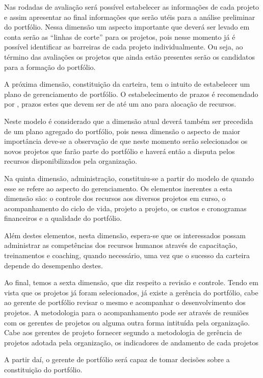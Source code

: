 \documentclass[12pt,a4paper,ruledheader,tocpage=prefix,floatnumber=continuous,pagestart=folhaderosto,font=times]{abnt}
\begin{document}
Nas rodadas de avaliação será possível estabelecer as informações de cada projeto e assim apresentar ao final informações que serão utéis para a análise 
preliminar do portfólio. Nessa dimensão um aspecto importante que deverá ser levado em conta serão as ``linhas de corte'' para os projetos, pois nesse 
momento já é possível identificar as barreiras de cada projeto individualmente. Ou seja, ao término das avaliações os projetos que ainda estão presentes 
serão os candidatos para a formação do portfólio.

A próxima dimensão, constituição da carteira, tem o intuito de estabelecer um plano de gerenciamento de portfólio. O estabelecimento de prazos é 
recomendado por \cite{clark}, prazos estes que devem ser de até um ano para alocação de recursos. 

Neste modelo é considerado que a dimensão atual deverá também ser precedida de um plano agregado do portfólio, pois nessa dimensão o aspecto de maior 
importância deve-se a observação de que neste momento serão selecionados os novos projetos que farão parte do portfólio e haverá então a disputa pelos 
recursos disponibilizados pela organização.

Na quinta dimensão, administração, constituiu-se a partir do modelo de \cite{crawford} quando esse se refere ao aspecto do gerenciamento. Os elementos 
inerentes a esta dimensão são: o controle dos recursos aos diversos projetos em curso, o acompanhamento do ciclo de vida, projeto a projeto, os custos e 
cronogramas financeiros e a qualidade do portfólio. 

Além destes elementos, nesta dimensão, espera-se que os interessados possam administrar as competências dos recursos humanos através de capacitação, 
treinamentos e coaching, quando necessário, uma vez que o sucesso da carteira depende do desempenho destes.

Ao final, temos a sexta dimensão, que diz respeito a revisão e controle. Tendo em vista que os projetos já foram selecionados, já existe a gerência do 
portfólio, cabe ao gerente de portfólio revisar o mesmo e acompanhar o desenvolvimento dos projetos. A metodologia para o acompanhamento pode ser através 
de reuniões com os gerentes de projetos ou alguma outra forma intituída pela organização. Cabe aos gerentes de projeto fornecer segundo a metodologia de 
gerência de projetos adotada pela organização, os indicadores de andamento de cada projetos

A partir daí, o gerente de portfólio será capaz de tomar decisões sobre a constituição do portfólio.
\end{document}
